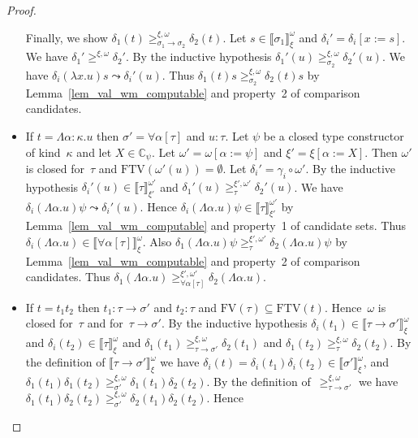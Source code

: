 \documentclass[a4paper,UKenglish,cleveref,autoref,numberwithinsect]{lipics-v2019}
\theoremstyle{definition}
\newcommand{\arrtype}{\rightarrow}
\newcommand{\subst}[2]{#1:=#2}
\newcommand{\abs}[2]{\lambda #1.#2}
\newcommand{\tabs}[2]{\Lambda #1.#2}
\newcommand{\FTV}{\mathrm{FTV}}
\newcommand{\FV}{\mathrm{FV}}
\newcommand{\Cb}{\mathbb{C}}
\newcommand{\val}[3]{\ensuremath{\llbracket#1\rrbracket_{#2}^{#3}}}
\newcommand{\gteq}[3]{\ensuremath{\ge_{#1}^{#2,#3}}}
\begin{document}
\begin{proof}
\begin{itemize}
    Finally, we show $\delta_1(t)
    \gteq{\sigma_1\arrtype\sigma_2}{\xi}{\omega} \delta_2(t)$. Let $s
    \in \val{\sigma_1}{\xi}{\omega}$ and
    $\delta_i'=\delta_i[\subst{x}{s}]$. We have $\delta_1'
    \gteq{}{\xi}{\omega} \delta_2'$. By the inductive hypothesis
    $\delta_1'(u) \gteq{\sigma_2}{\xi}{\omega} \delta_2'(u)$. We have
    $\delta_i(\abs{x}{u}) s \leadsto \delta_i'(u)$. Thus $\delta_1(t)
    s \gteq{\sigma_2}{\xi}{\omega} \delta_2(t) s$ by
    Lemma~\ref{lem_val_wm_computable} and property~2 of comparison
    candidates.
  \item If $t = \tabs{\alpha:\kappa}{u}$ then $\sigma' =
    \forall\alpha[\tau]$ and $u : \tau$. Let $\psi$ be a closed type
    constructor of kind~$\kappa$ and let $X \in \Cb_\psi$. Let
    $\omega' = \omega[\subst{\alpha}{\psi}]$ and
    $\xi'=\xi[\subst{\alpha}{X}]$. Then $\omega'$ is closed for~$\tau$
    and $\FTV(\omega'(u)) = \emptyset$. Let
    $\delta_i'=\gamma_i\circ\omega'$. By the inductive hypothesis
    $\delta_i'(u) \in \val{\tau}{\xi'}{\omega'}$ and $\delta_1'(u)
    \gteq{\tau}{\xi'}{\omega'} \delta_2'(u)$. We have
    $\delta_i(\tabs{\alpha}{u}) \psi \leadsto \delta_i'(u)$. Hence
    $\delta_i(\tabs{\alpha}{u}) \psi \in \val{\tau}{\xi'}{\omega'}$ by
    Lemma~\ref{lem_val_wm_computable} and property~1 of candidate
    sets. Thus $\delta_i(\tabs{\alpha}{u}) \in
    \val{\forall\alpha[\tau]}{\xi}{\omega}$. Also
    $\delta_1(\tabs{\alpha}{u}) \psi \gteq{\tau}{\xi'}{\omega'}
    \delta_2(\tabs{\alpha}{u}) \psi$ by
    Lemma~\ref{lem_val_wm_computable} and property~2 of comparison
    candidates. Thus $\delta_1(\tabs{\alpha}{u})
    \gteq{\forall\alpha[\tau]}{\xi'}{\omega'}
    \delta_2(\tabs{\alpha}{u})$.
  \item If $t = t_1 t_2$ then $t_1 : \tau\arrtype\sigma'$ and $t_2 :
    \tau$ and $\FV(\tau) \subseteq \FTV(t)$. Hence~$\omega$ is closed
    for~$\tau$ and for~$\tau\arrtype\sigma'$. By the inductive
    hypothesis $\delta_i(t_1) \in
    \val{\tau\arrtype\sigma'}{\xi}{\omega}$ and $\delta_i(t_2) \in
    \val{\tau}{\xi}{\omega}$ and $\delta_1(t_1)
    \gteq{\tau\arrtype\sigma'}{\xi}{\omega} \delta_2(t_1)$ and
    $\delta_1(t_2) \gteq{\tau}{\xi}{\omega} \delta_2(t_2)$. By the
    definition of $\val{\tau\arrtype\sigma'}{\xi}{\omega}$ we have
    $\delta_i(t) = \delta_i(t_1)\delta_i(t_2) \in
    \val{\sigma'}{\xi}{\omega}$, and $\delta_1(t_1)\delta_1(t_2)
    \gteq{\sigma'}{\xi}{\omega} \delta_1(t_1)\delta_2(t_2)$. By the
    definition of~$\gteq{\tau\arrtype\sigma'}{\xi}{\omega}$ we have
    $\delta_1(t_1)\delta_2(t_2)\gteq{\sigma'}{\xi}{\omega}\delta_2(t_1)\delta_2(t_2)$. Hence

\end{itemize}
\end{proof}
\end{document}
